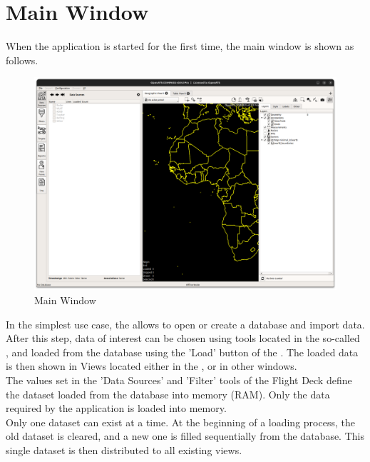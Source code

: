 \section{Main Window}
\label{sec:ui_main_window} 

When the application is started for the first time, the main window is shown as follows. 

\begin{figure}[H]
  \center
    \includegraphics[width=15cm]{figures/main_window.png}
  \caption{Main Window}
\end{figure}

In the simplest use case, the  allows to open or create a database and import data.
After this step, data of interest can be chosen using tools located in the so-called , 
and loaded from the database using the 'Load' button of the . 
The loaded data is then shown in Views located either in the , or in other windows. \\

The values set in the 'Data Sources' and 'Filter' tools of the Flight Deck define the dataset loaded from the database into memory (RAM). 
Only the data required by the application is loaded into memory. \\

Only one dataset can exist at a time. At the beginning of a loading process, the old dataset is cleared, and a new one is filled sequentially from the database. 
This single dataset is then distributed to all existing views. \\

